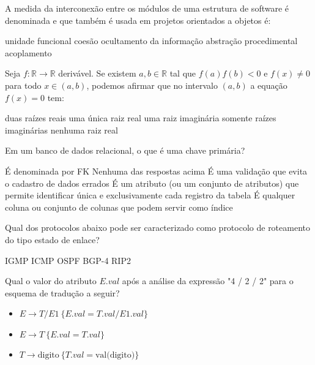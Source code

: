 \documentclass[12pt, addpoints]{exam}
\begin{document}
\begin{questions}
\question
A medida da interconexão entre os módulos de uma estrutura de software é denominada e que também é usada em projetos orientados a objetos é: 
\begin{choices}
\choice unidade funcional
\choice coesão
\choice ocultamento da informação
\choice abstração procedimental
\choice acoplamento
\end{choices}

\question
Seja \( f : \mathbb{R} \to \mathbb{R} \) derivável. Se existem \( a, b \in \mathbb{R} \) tal que \( f(a)f(b) < 0 \) e \( f(x) \neq 0 \) para todo \( x \in (a, b) \), podemos afirmar que no intervalo \( (a, b) \) a equação \( f(x) = 0 \) tem:
\begin{choices}
\choice duas raízes reais
\choice uma única raiz real
\choice uma raiz imaginária
\choice somente raízes imaginárias
\choice nenhuma raiz real
\end{choices}

\question
Em um banco de dados relacional, o que é uma chave primária?

\begin{choices}
\choice É denominada por FK
\choice Nenhuma das respostas acima
\choice É uma validação que evita o cadastro de dados errados
\choice É um atributo (ou um conjunto de atributos) que permite identificar única e exclusivamente cada registro da tabela
\choice É qualquer coluna ou conjunto de colunas que podem servir como índice
\end{choices}

\question
Qual dos protocolos abaixo pode ser caracterizado como protocolo de roteamento do tipo estado de enlace?
\begin{choices}
\choice IGMP
\choice ICMP
\choice OSPF
\choice BGP-4
\choice RIP2
\end{choices}

\question
Qual o valor do atributo \( E.val \) após a análise da expressão "4 / 2 / 2" para o esquema de tradução a seguir?

\begin{itemize}
    \item \( E \rightarrow T / E1 \ \{ E.val = T.val / E1.val \} \)
    \item \( E \rightarrow T \ \{ E.val = T.val \} \)
    \item \( T \rightarrow \text{digito} \ \{ T.val = \text{val(digito)} \} \)
\end{itemize}

\begin{choices}
\end{choices}


\end{questions}
\end{document}
